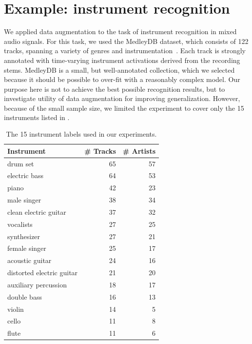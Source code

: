 \documentclass{article}
\begin{document}
\section{Example: instrument recognition}

We applied data augmentation to the task of instrument recognition in mixed audio signals.
For this task, we used the MedleyDB dataset, which consists of 122 tracks, spanning a variety of genres and instrumentation~\cite{bittner2014medleydb}.
Each track is strongly annotated with time-varying instrument activations derived from the recording stems.
MedleyDB is a small, but well-annotated collection, which we selected because
it should be possible to over-fit with a reasonably complex model.
Our purpose here is not to achieve the best possible recognition results, but to
investigate utility of data augmentation for improving generalization.
However, because of the small sample size, we limited the experiment to cover only 
the 15 instruments listed in .


\begin{table}
\caption{The 15 instrument labels used in our experiments.\label{medleytags}}
\centering
\small
    \begin{tabular}{lrr}
        \toprule
        Instrument & \# Tracks & \# Artists\\
        \midrule
        drum set                    & 65 & 57\\
        electric bass               & 64 & 53\\
        piano                       & 42 & 23\\
        male singer                 & 38 & 34\\
        clean electric guitar       & 37 & 32\\
        vocalists                   & 27 & 25\\
        synthesizer                 & 27 & 21\\
        female singer               & 25 & 17\\
        acoustic guitar             & 24 & 16\\
        distorted electric guitar   & 21 & 20 \\
        auxiliary percussion        & 18 & 17\\
        double bass                 & 16 & 13\\
        violin                      & 14 & 5\\
        cello                       & 11 & 8\\
        flute                       & 11 & 6\\
        \bottomrule
    \end{tabular}
\end{table}
\end{document}
